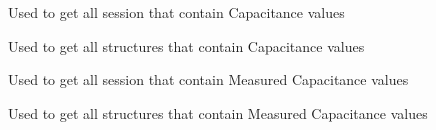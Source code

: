 \documentclass[letterpaper,10pt,english]{sphinxmanual}
\begin{document}

\begin{fulllineitems}
\label{\detokenize{app:app.getCSess}}
\pysigstartsignatures
{}
\pysigstopsignatures
\sphinxAtStartPar
Used to get all session that contain Capacitance values

\end{fulllineitems}


\begin{fulllineitems}
\label{\detokenize{app:app.getCStruct}}
\pysigstartsignatures
{}
\pysigstopsignatures
\sphinxAtStartPar
Used to get all structures that contain Capacitance values

\end{fulllineitems}


\begin{fulllineitems}
\label{\detokenize{app:app.getCmesSess}}
\pysigstartsignatures
{}
\pysigstopsignatures
\sphinxAtStartPar
Used to get all session that contain Measured Capacitance values

\end{fulllineitems}


\begin{fulllineitems}
\label{\detokenize{app:app.getCmesStruct}}
\pysigstartsignatures
{}
\pysigstopsignatures
\sphinxAtStartPar
Used to get all structures that contain Measured Capacitance values

\end{fulllineitems}
\end{document}
